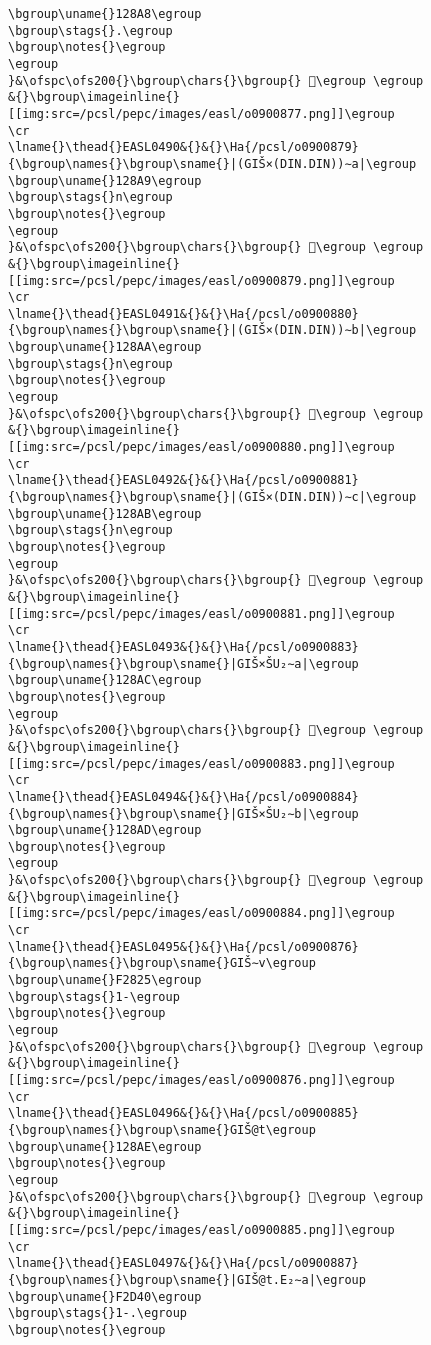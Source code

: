 \begin{verbatim}
\bgroup\uname{}128A8\egroup
\bgroup\stags{}.\egroup
\bgroup\notes{}\egroup
\egroup
}&\ofspc\ofs200{}\bgroup\chars{}\bgroup{} 𒢨\egroup \egroup
&{}\bgroup\imageinline{}[[img:src=/pcsl/pepc/images/easl/o0900877.png]]\egroup
\cr
\lname{}\thead{}EASL0490&{}&{}\Ha{/pcsl/o0900879}{\bgroup\names{}\bgroup\sname{}|(GIŠ×(DIN.DIN))∼a|\egroup
\bgroup\uname{}128A9\egroup
\bgroup\stags{}n\egroup
\bgroup\notes{}\egroup
\egroup
}&\ofspc\ofs200{}\bgroup\chars{}\bgroup{} 𒢩\egroup \egroup
&{}\bgroup\imageinline{}[[img:src=/pcsl/pepc/images/easl/o0900879.png]]\egroup
\cr
\lname{}\thead{}EASL0491&{}&{}\Ha{/pcsl/o0900880}{\bgroup\names{}\bgroup\sname{}|(GIŠ×(DIN.DIN))∼b|\egroup
\bgroup\uname{}128AA\egroup
\bgroup\stags{}n\egroup
\bgroup\notes{}\egroup
\egroup
}&\ofspc\ofs200{}\bgroup\chars{}\bgroup{} 𒢪\egroup \egroup
&{}\bgroup\imageinline{}[[img:src=/pcsl/pepc/images/easl/o0900880.png]]\egroup
\cr
\lname{}\thead{}EASL0492&{}&{}\Ha{/pcsl/o0900881}{\bgroup\names{}\bgroup\sname{}|(GIŠ×(DIN.DIN))∼c|\egroup
\bgroup\uname{}128AB\egroup
\bgroup\stags{}n\egroup
\bgroup\notes{}\egroup
\egroup
}&\ofspc\ofs200{}\bgroup\chars{}\bgroup{} 𒢫\egroup \egroup
&{}\bgroup\imageinline{}[[img:src=/pcsl/pepc/images/easl/o0900881.png]]\egroup
\cr
\lname{}\thead{}EASL0493&{}&{}\Ha{/pcsl/o0900883}{\bgroup\names{}\bgroup\sname{}|GIŠ×ŠU₂∼a|\egroup
\bgroup\uname{}128AC\egroup
\bgroup\notes{}\egroup
\egroup
}&\ofspc\ofs200{}\bgroup\chars{}\bgroup{} 𒢬\egroup \egroup
&{}\bgroup\imageinline{}[[img:src=/pcsl/pepc/images/easl/o0900883.png]]\egroup
\cr
\lname{}\thead{}EASL0494&{}&{}\Ha{/pcsl/o0900884}{\bgroup\names{}\bgroup\sname{}|GIŠ×ŠU₂∼b|\egroup
\bgroup\uname{}128AD\egroup
\bgroup\notes{}\egroup
\egroup
}&\ofspc\ofs200{}\bgroup\chars{}\bgroup{} 𒢭\egroup \egroup
&{}\bgroup\imageinline{}[[img:src=/pcsl/pepc/images/easl/o0900884.png]]\egroup
\cr
\lname{}\thead{}EASL0495&{}&{}\Ha{/pcsl/o0900876}{\bgroup\names{}\bgroup\sname{}GIŠ∼v\egroup
\bgroup\uname{}F2825\egroup
\bgroup\stags{}1-\egroup
\bgroup\notes{}\egroup
\egroup
}&\ofspc\ofs200{}\bgroup\chars{}\bgroup{} 󲠥\egroup \egroup
&{}\bgroup\imageinline{}[[img:src=/pcsl/pepc/images/easl/o0900876.png]]\egroup
\cr
\lname{}\thead{}EASL0496&{}&{}\Ha{/pcsl/o0900885}{\bgroup\names{}\bgroup\sname{}GIŠ@t\egroup
\bgroup\uname{}128AE\egroup
\bgroup\notes{}\egroup
\egroup
}&\ofspc\ofs200{}\bgroup\chars{}\bgroup{} 𒢮\egroup \egroup
&{}\bgroup\imageinline{}[[img:src=/pcsl/pepc/images/easl/o0900885.png]]\egroup
\cr
\lname{}\thead{}EASL0497&{}&{}\Ha{/pcsl/o0900887}{\bgroup\names{}\bgroup\sname{}|GIŠ@t.E₂∼a|\egroup
\bgroup\uname{}F2D40\egroup
\bgroup\stags{}1-.\egroup
\bgroup\notes{}\egroup

\end{verbatim}
